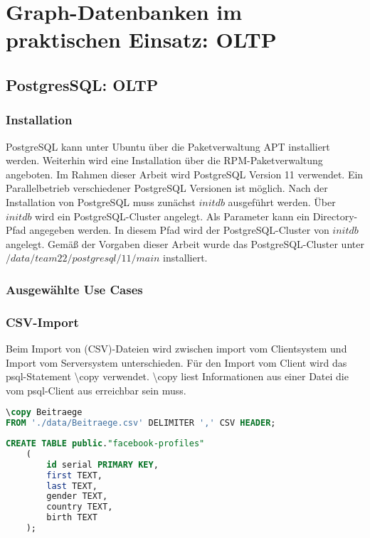 \chapter{Graph-Datenbanken im praktischen Einsatz: OLTP}
\section{PostgresSQL: OLTP}
\subsection{Installation}
PostgreSQL kann unter Ubuntu über die Paketverwaltung APT installiert werden. Weiterhin wird eine Installation über die RPM-Paketverwaltung angeboten. Im Rahmen dieser Arbeit wird PostgreSQL Version 11 verwendet. Ein Parallelbetrieb verschiedener PostgreSQL Versionen ist möglich. 
Nach der Installation von PostgreSQL muss zunächst $initdb$ ausgeführt werden. Über $initdb$ wird ein PostgreSQL-Cluster angelegt. Als Parameter kann ein Directory-Pfad angegeben werden. In diesem Pfad wird der PostgreSQL-Cluster von $initdb$ angelegt.
Gemäß der Vorgaben dieser Arbeit wurde das PostgreSQL-Cluster unter $/data/team22/postgresql/11/main$ installiert.
\subsection{Ausgewählte Use Cases}
\subsection{CSV-Import}
Beim Import von (CSV)-Dateien wird zwischen import vom Clientsystem und  Import vom Serversystem unterschieden. 
Für den Import vom Client wird das psql-Statement \textbackslash copy verwendet. \textbackslash copy liest Informationen aus einer Datei die vom psql-Client aus erreichbar sein muss. \cite{postgres2018}

\begin{lstlisting}[language=SQL,caption=CSV Input,frame=single]
\copy Beitraege 
FROM './data/Beitraege.csv' DELIMITER ',' CSV HEADER;
\end{lstlisting}


\begin{lstlisting}[language=SQL,caption=Anlegen der Tabelle facebook-profiles,frame=single]
    CREATE TABLE public."facebook-profiles"
    (
        id serial PRIMARY KEY,
        first TEXT,
        last TEXT,
        gender TEXT,
        country TEXT,
        birth TEXT
    );
\end{lstlisting}

